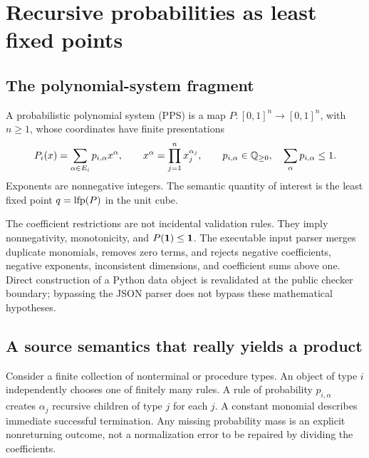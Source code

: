\section{Recursive probabilities as least fixed points}
\label{sec:pps}

\subsection{The polynomial-system fragment}
\begin{definition}
A probabilistic polynomial system (PPS) is a map $P:[0,1]^n\to[0,1]^n$, with $n\ge1$, whose coordinates have finite presentations
\begin{equation}
 \label{eq:pps}
 P_i(x)=\sum_{\alpha\in E_i}p_{i,\alpha}x^\alpha,
 \qquad x^\alpha=\prod_{j=1}^{n}x_j^{\alpha_j},
 \qquad p_{i,\alpha}\in\mathbb Q_{\ge0},\quad
 \sum_\alpha p_{i,\alpha}\le1.
\end{equation}
Exponents are nonnegative integers. The semantic quantity of interest is the least fixed point $q=\operatorname{lfp}(P)$ in the unit cube.
\end{definition}

The coefficient restrictions are not incidental validation rules. They imply nonnegativity, monotonicity, and $P(\mathbf 1)\le\mathbf 1$. The executable input parser merges duplicate monomials, removes zero terms, and rejects negative coefficients, negative exponents, inconsistent dimensions, and coefficient sums above one. Direct construction of a Python data object is revalidated at the public checker boundary; bypassing the JSON parser does not bypass these mathematical hypotheses.

\subsection{A source semantics that really yields a product}
Consider a finite collection of nonterminal or procedure types. An object of type $i$ independently chooses one of finitely many rules. A rule of probability $p_{i,\alpha}$ creates $\alpha_j$ recursive children of type $j$ for each $j$. A constant monomial describes immediate successful termination. Any missing probability mass is an explicit nonreturning outcome, not a normalization error to be repaired by dividing the coefficients.

